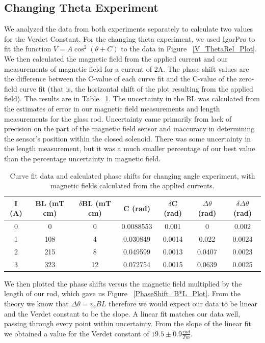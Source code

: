 \documentclass[prb,preprint]{revtex4-1}
\begin{document}
\subsection{Changing Theta Experiment}
We analyzed the data from both experiments separately to calculate two values for the Verdet Constant.  For the changing theta experiment, we used IgorPro to fit the function $V = A \cos ^2 (\theta + C)$ to the data in Figure ~\ref{V_ThetaRel_Plot}.  We then calculated the magnetic field from the applied current and our measurements of magnetic field for a current of 2A. The phase shift values are the difference between the C-value of each curve fit and the C-value of the zero-field curve fit (that is, the horizontal shift of the plot resulting from the applied field).  The results are in Table ~\ref{B*L_PhaseShift_Table}.  The uncertainty in the BL was calculated from the estimates of error in our magnetic field measurements and length measurements for the glass rod. Uncertainty came primarily from lack of precision on the part of the magnetic field sensor and inaccuracy in determining the sensor's position within the closed solenoid. There was some uncertainty in the length measurement, but it was a much smaller percentage of our best value than the percentage uncertainty in magnetic field.
\
\begin{table}[h!]
\centering
\caption{Curve fit data and calculated phase shifts for changing angle experiment, with magnetic fields calculated from the applied currents.}
\begin{ruledtabular}
\begin{tabular}{c c c c c c c}
I (A) & BL (mT cm) & $\delta$BL (mT cm) & C (rad)& $\delta$C (rad) & $\Delta \theta$ (rad) & $\delta \Delta \theta$ (rad)\\
\hline	%
0 &  0  & 0 &  0.0088553 & 0.001 & 0 & 0.002    \\
1 & 108 & 4  & 0.030849  & 0.0014 & 0.022  & 0.0024 \\
2 & 215 & 8 & 0.049599  & 0.0013 & 0.0407 & 0.0023  \\
3 & 323 & 12 & 0.072754  & 0.0015 & 0.0639 & 0.0025 
\end{tabular}
\end{ruledtabular}
\label{B*L_PhaseShift_Table}
\end{table}


We then plotted the phase shifts versus the magnetic field multiplied by the length of our rod, which gave us Figure ~\ref{PhaseShift_B*L_Plot}. From the theory we know that $\Delta \theta = v_c B L$ therefore we would expect our data to be linear and the Verdet constant to be the slope.  A linear fit matches our data well, passing through every point within uncertainty. From the slope of the linear fit we obtained a value for the Verdet constant of $19.5 \pm0.9 \frac{rad}{Tm}$.
\end{document}
